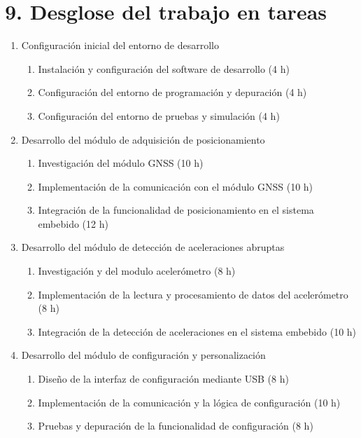 \documentclass[
11pt, %
codirector, %
]{charter}
\begin{document}
\section{9. Desglose del trabajo en tareas}
\label{sec:wbs}


\begin{enumerate}
    \item Configuración inicial del entorno de desarrollo
    \begin{enumerate}
        \item Instalación y configuración del software de desarrollo (4 h)
        \item Configuración del entorno de programación y depuración (4 h)
        \item Configuración del entorno de pruebas y simulación (4 h)
    \end{enumerate}
    
    \item Desarrollo del módulo de adquisición de posicionamiento
    \begin{enumerate}
        \item Investigación del módulo GNSS (10 h)
        \item Implementación de la comunicación con el módulo GNSS (10 h)
        \item Integración de la funcionalidad de posicionamiento en el sistema embebido (12 h)
    \end{enumerate}
    
    \item Desarrollo del módulo de detección de aceleraciones abruptas
    \begin{enumerate}
        \item Investigación y del modulo acelerómetro (8 h)
        \item Implementación de la lectura y procesamiento de datos del acelerómetro (8 h)
        \item Integración de la detección de aceleraciones en el sistema embebido (10 h)
    \end{enumerate}
    
    \item Desarrollo del módulo de configuración y personalización
    \begin{enumerate}
        \item Diseño de la interfaz de configuración mediante USB (8 h)
        \item Implementación de la comunicación y la lógica de configuración (10 h)
        \item Pruebas y depuración de la funcionalidad de configuración (8 h)
    \end{enumerate}
    

\end{enumerate}
\end{document}
